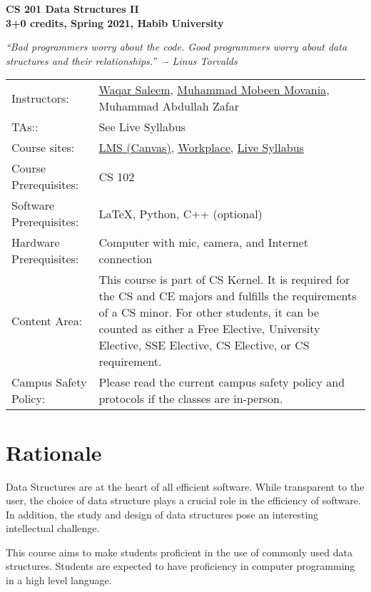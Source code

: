 \documentclass[a4paper]{article}
\begin{document}
\begin{center}
  {\bfseries {\huge CS 201 Data Structures II}\\\bigskip
    {\large 3+0 credits, Spring 2021, Habib University}}\\\medskip

\textit{``Bad programmers worry about the code. Good programmers worry about data structures and
their relationships.''  –- Linus Torvalds}
\end{center}
\medskip

\noindent
\begin{tabularx}{1.0\linewidth}{lX}
  Instructors:
  & \href{https://habib.edu.pk/SSE/dr-waqar-saleem/}{Waqar Saleem}, \href{https://habib.edu.pk/SSE/muhammad-mobeen-movania/}{Muhammad Mobeen Movania}, Muhammad Abdullah Zafar\\
  TAs:: & See Live Syllabus \\
  Course sites: & \href{https://hulms.instructure.com/courses/1260}{LMS (Canvas)}, \href{https://habibedu.workplace.com/groups/145941763811786}{Workplace}, \href{https://bit.ly/3bSQH1k}{Live Syllabus}\\
  Course Prerequisites: &  CS 102\\
  Software Prerequisites: &  \LaTeX, Python, C++ (optional)\\
  Hardware Prerequisites: & Computer with mic, camera, and Internet connection\\
  Content Area: & This course is part of CS Kernel. It is required for the CS and CE majors and fulfills the requirements of a CS minor. For other students, it can be counted as either a Free Elective, University Elective, SSE Elective, CS Elective, or CS requirement.\\
  Campus Safety Policy: & Please read the current campus safety policy and protocols if the classes are in-person.  
\end{tabularx}
\medskip

\section{Rationale}

Data Structures are at the heart of all efficient software. While transparent to the user, the choice of data structure plays a crucial role in the efficiency of software. In addition, the study and design of data structures pose an interesting intellectual challenge. 

This course aims to make students proficient in the use of commonly used data structures. Students are expected to have proficiency in computer programming in a high level language. 
\end{document}
